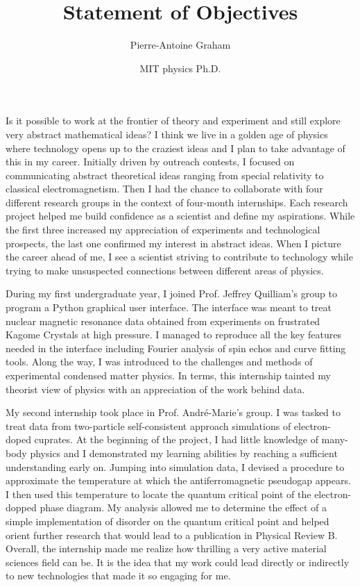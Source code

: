 \documentclass[12pt]{article}
\title{Statement of Objectives}
\author{Pierre-Antoine Graham}
\date{MIT physics Ph.D.}
\begin{document}
\maketitle
\vspace{0.5cm}


Is it possible to work at the frontier of theory and experiment and still explore very abstract mathematical ideas? I think we live in a golden age of physics where technology opens up to the craziest ideas and I plan to take advantage of this in my career. Initially driven by outreach contests, I focused on communicating abstract theoretical ideas ranging from special relativity to classical electromagnetism. Then I had the chance to collaborate with four different research groups in the context of four-month internships. Each research project helped me build confidence as a scientist and define my aspirations. While the first three increased my appreciation of experiments and technological prospects, the last one confirmed my interest in abstract ideas. When I picture the career ahead of me, I see a scientist striving to contribute to technology while trying to make unsuspected connections between different areas of physics. 
\vspace{0.4cm}

During my first undergraduate year, I joined Prof. Jeffrey Quilliam's group to program a Python graphical user interface. The interface was meant to treat nuclear magnetic resonance data obtained from experiments on frustrated Kagome Crystals at high pressure. I managed to reproduce all the key features needed in the interface including Fourier analysis of spin echos and curve fitting tools. Along the way, I was introduced to the challenges and methods of experimental condensed matter physics. In terms, this internship tainted my theorist view of physics with an appreciation of the work behind data.\vspace{0.4cm}

My second internship took place in Prof. André-Marie's group. I was tasked to treat data from two-particle self-consistent approach simulations of electron-doped cuprates. At the beginning of the project, I had little knowledge of many-body physics and I demonstrated my learning abilities by reaching a sufficient understanding early on. Jumping into simulation data, I devised a procedure to approximate the temperature at which the antiferromagnetic pseudogap appears. I then used this temperature to locate the quantum critical point of the electron-dopped phase diagram. My analysis allowed me to determine the effect of a simple implementation of disorder on the quantum critical point and helped orient further research that would lead to a publication in Physical Review B. Overall, the internship made me realize how thrilling a very active material sciences field can be. It is the idea that my work could lead directly or indirectly to new technologies that made it so engaging for me.\vspace{0.4cm} 
\end{document}
